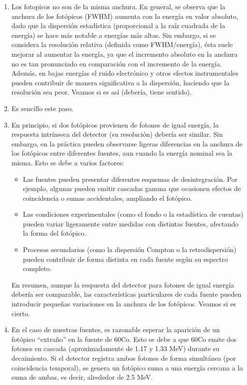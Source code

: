\documentclass[11pt]{article}
\begin{document}
\begin{enumerate}[label=\alph*)]
    \item Los fotopicos no son de la misma anchura. En general, se observa que la anchura de los fotópicos (FWHM) aumenta con la energía en valor absoluto, dado que la dispersión estadística (proporcional a la raíz cuadrada de la energía) se hace más notable a energías más altas. Sin embargo, si se considera la resolución relativa (definida como FWHM/energía), ésta suele mejorar al aumentar la energía, ya que el incremento absoluto en la anchura no es tan pronunciado en comparación con el incremento de la energía. Además, en bajas energías el ruido electrónico y otros efectos instrumentales pueden contribuir de manera significativa a la dispersión, haciendo que la resolución sea peor. \textcolor{BrickRed}{Veamos si es así (debería, tiene sentido).}
    \item \textcolor{BrickRed}{Es sencillo este paso.}
    \item En principio, si dos fotópicos provienen de fotones de igual energía, la respuesta intrínseca del detector (su resolución) debería ser similar. Sin embargo, en la práctica pueden observarse ligeras diferencias en la anchura de los fotópicos entre diferentes fuentes, aun cuando la energía nominal sea la misma. Esto se debe a varios factores:
    \begin{itemize}
    \item Las fuentes pueden presentar diferentes esquemas de desintegración. Por ejemplo, algunas pueden emitir cascadas gamma que ocasionen efectos de coincidencia o sumas accidentales, ampliando el fotópico.
    
    \item Las condiciones experimentales (como el fondo o la estadística de cuentas) pueden variar ligeramente entre medidas con distintas fuentes, afectando la forma del fotópico.
    
    \item Procesos secundarios (como la dispersión Compton o la retrodispersión) pueden contribuir de forma distinta en cada fuente según su espectro completo.
    \end{itemize}
    En resumen, aunque la respuesta del detector para fotones de igual energía debería ser comparable, las características particulares de cada fuente pueden introducir pequeñas variaciones en la anchura de los fotópicos. \textcolor{BrickRed}{Veamos si es cierto.}
    \item En el caso de nuestras fuentes, es razonable esperar la aparición de un fotópico “extraño” en la fuente de 60Co. Esto se debe a que 60Co emite dos fotones en cascada (aproximadamente de 1.17 y 1.33 MeV) durante su decaimiento. Si el detector registra ambos fotones de forma simultánea (por coincidencia temporal), se genera un fotópico suma a una energía cercana a la suma de ambas, es decir, alrededor de 2.5 MeV.


\end{enumerate}
\end{document}
